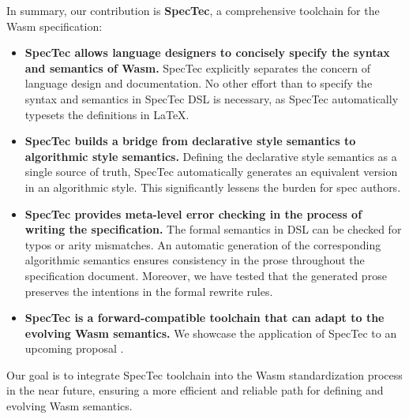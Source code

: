 In summary, our contribution is \textbf{SpecTec}, a comprehensive toolchain for the Wasm specification:
\begin{itemize}
\item \textbf{SpecTec allows language designers to concisely specify the syntax and semantics of Wasm.} SpecTec explicitly separates the concern of language design and documentation. No other effort than to specify the syntax and semantics in SpecTec DSL is necessary, as SpecTec automatically typesets the definitions in LaTeX.
\item \textbf{SpecTec builds a bridge from declarative style semantics to algorithmic style semantics.} Defining the declarative style semantics as a single source of truth, SpecTec automatically generates an equivalent version in an algorithmic style. This significantly lessens the burden for spec authors.
\item \textbf{SpecTec provides meta-level error checking in the process of writing the specification.} The formal semantics in DSL can be checked for typos or arity mismatches. An automatic generation of the corresponding algorithmic semantics ensures consistency in the prose throughout the specification document. Moreover, we have tested that the generated prose preserves the intentions in the formal rewrite rules.
\item \textbf{SpecTec is a forward-compatible toolchain that can adapt to the evolving Wasm semantics.} We showcase the application of SpecTec to an upcoming proposal . 
\end{itemize}

Our goal is to integrate SpecTec toolchain into the Wasm standardization process in the near future, ensuring a more efficient and reliable path for defining and evolving Wasm semantics.
